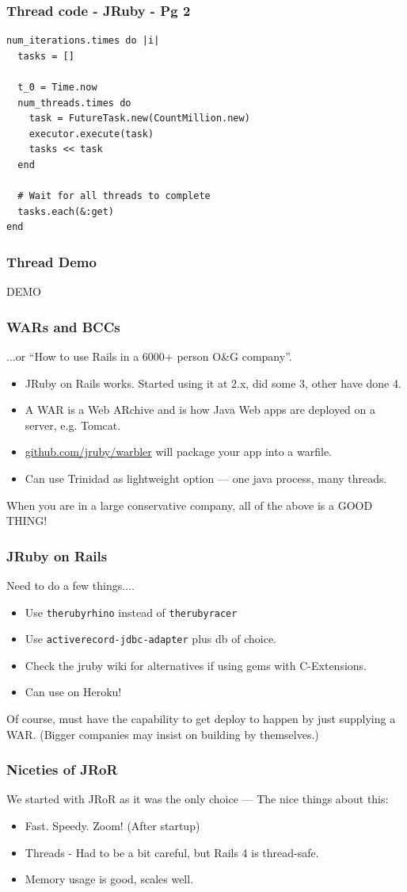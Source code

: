 \begin{frame}[fragile]\frametitle{Thread code - JRuby - Pg 2}
\begin{lstlisting}
num_iterations.times do |i|
  tasks = []

  t_0 = Time.now
  num_threads.times do
    task = FutureTask.new(CountMillion.new)
    executor.execute(task)
    tasks << task
  end

  # Wait for all threads to complete
  tasks.each(&:get)
end
\end{lstlisting}
\end{frame}
\begin{frame}\frametitle{Thread Demo}
  \begin{center}
  {\Huge DEMO}
  \end{center}
\end{frame}
\begin{frame}\frametitle{WARs and BCCs}
  ...or ``How to use Rails in a 6000+ person O\&G company''.
  \begin{itemize}
    \item JRuby on Rails works. Started using it at 2.x, did some 3, other have done 4.
    \item A WAR is a Web ARchive and is how Java Web apps are deployed on a server, e.g. Tomcat.
    \item \url{github.com/jruby/warbler} will package your app into a warfile.
    \item Can use Trinidad as lightweight option --- one java process, many threads.
  \end{itemize}
  When you are in a large conservative company, all of the above is a GOOD THING!
\end{frame}
\begin{frame}\frametitle{JRuby on Rails}
  Need to do a few things....
  \begin{itemize}
    \item Use \texttt{therubyrhino} instead of \texttt{therubyracer}
    \item Use \texttt{activerecord-jdbc-adapter} plus db of choice.
    \item Check the jruby wiki for alternatives if using gems with C-Extensions.
    \item Can use on Heroku!
  \end{itemize}
  Of course, must have the capability to get deploy to happen by just supplying a WAR. (Bigger
  companies may insist on building by themselves.)
\end{frame}
\begin{frame}\frametitle{Niceties of JRoR}
  We started with JRoR as it was the only choice --- The nice things about this:
  \begin{itemize}
    \item Fast. Speedy. Zoom! (After startup)
    \item Threads - Had to be a bit careful, but Rails 4 is thread-safe.
    \item Memory usage is good, scales well.
  \end{itemize}
\end{frame}

